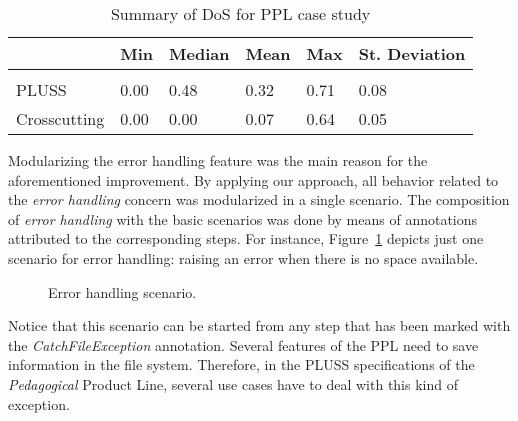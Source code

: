 \begin{table}[htb] \centering
\caption{Summary of DoS for PPL case study}
\label{tab:ppl-dos}
\begin{small}
\begin{tabular}{llllll} \hline
					& Min 	& Median 	& Mean 	& Max 	& St. Deviation \\ \hline \\
	PLUSS			& 0.00	& 0.48		& 0.32	& 0.71	& 0.08			\\
	Crosscutting	& 0.00  & 0.00   	& 0.07 	& 0.64 	& 0.05			\\ \hline	
\end{tabular}
\end{small}
\end{table}


Modularizing the error handling feature was the main reason for the
aforementioned improvement. By applying our approach, all behavior related to
the \emph{error handling} concern was modularized in a single scenario. The
composition of \emph{error handling} with the basic scenarios was done by means
of annotations attributed to the corresponding steps. For instance,
Figure~\ref{fig:error-handle} depicts just one scenario for error handling:
raising  an error when there is no space available.


\begin{figure}[h] 
\caption{Error handling scenario.}
\label{fig:error-handle} 
\end{figure}

Notice that this scenario can be started from any step that has been marked with
the \emph{CatchFileException} annotation.
Several features of the PPL need to save information in the file system.
Therefore, in the PLUSS specifications of the \emph{Pedagogical}
Product Line, several use cases have to deal with this kind of exception.

